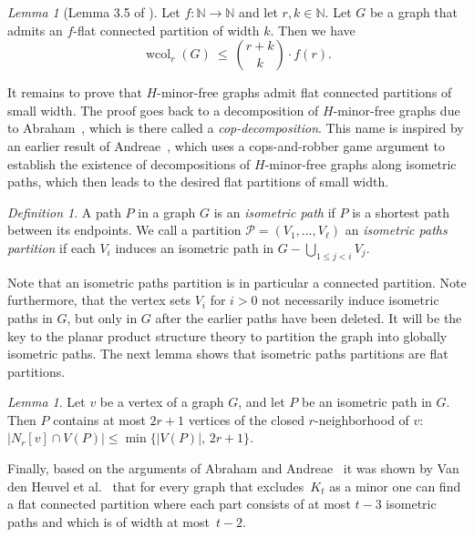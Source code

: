 \documentclass[1p,number,a4paper]{elsarticle}
\theoremstyle{remark}
\newcommand{\Pp}{\mathcal{P}}
\newcommand{\N}{\mathbb{N}}
\DeclareMathOperator{\wcol}{wcol}
\newtheorem{definition}[theorem]{Definition}
\newtheorem{lemma}[theorem]{Lemma}
\begin{document}
\begin{lemma}[Lemma 3.5 of \cite{van2017generalised}]\label{lem:spdwcol}
  Let $f:\N\to\N$ and let $r,k\in\N$. Let $G$ be a graph that admits an $f$-flat connected partition of width $k$. Then we have
  \begin{equation*}
    \wcol_r(G)\:\le\: \binom{r+k}{k}\cdot f(r).
  \end{equation*}
\end{lemma}

It remains to prove that $H$-minor-free graphs admit flat connected partitions of small width. The proof goes back to a decomposition of $H$-minor-free graphs due to Abraham~\cite{abraham14}, which is there called a \emph{cop-decomposition}. 
This name
is inspired by an earlier result of Andreae~\cite{andreae86}, which uses a
cops-and-robber game argument to establish the existence of decompositions of $H$-minor-free graphs along isometric paths, which then leads to the desired flat partitions of small width. 

\begin{definition}
  A path $P$ in a graph $G$ is an \emph{isometric path} if $P$ is a shortest
  path between its endpoints. We call a partition $\Pp=(V_1,\ldots, V_\ell)$ an
  \emph{isometric paths partition} if each $V_i$ induces an isometric path in
  $G-\bigcup_{1\le j<i} V_j$. 
\end{definition}

Note that an isometric paths partition is in particular a connected partition. 
Note furthermore, that the vertex sets $V_i$ for $i>0$ not necessarily induce isometric paths in $G$, but only in $G$ after the earlier paths have been deleted. 
It will be the key to the planar product structure theory to partition the graph into globally isometric paths. The next lemma shows that isometric paths partitions are flat partitions.  

\begin{lemma}\label{lem:shortestpath}
  Let $v$ be a vertex of a graph $G$, and let $P$ be an isometric path in
  $G$. Then $P$ contains at most $2r+1$ vertices of the closed
  $r$-neighborhood of $v$:
  $|N_r[v]\cap V(P)|\le \min\{|V(P)|,\,2r+1\}$.
\end{lemma}

Finally, based on the arguments of Abraham and Andreae~\cite{abraham14,andreae86} it was shown by Van den Heuvel et al.~\cite{van2017generalised} that for every graph that excludes~$K_t$ as a minor one can find a flat connected partition where each part consists of at most $t-3$ isometric paths and which is of width at most~$t-2$. 
\end{document}
